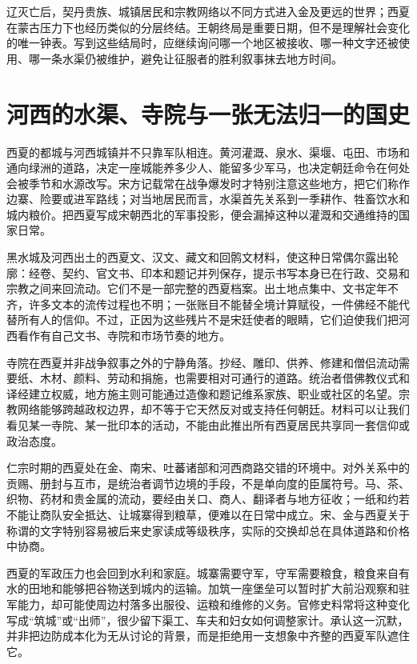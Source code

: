 辽灭亡后，契丹贵族、城镇居民和宗教网络以不同方式进入金及更远的世界；西夏在蒙古压力下也经历类似的分层终结。王朝终局是重要日期，但不是理解社会变化的唯一钟表。写到这些结局时，应继续询问哪一个地区被接收、哪一种文字还被使用、哪一条水渠仍被维护，避免让征服者的胜利叙事抹去地方时间。


\section{河西的水渠、寺院与一张无法归一的国史}

西夏的都城与河西城镇并不只靠军队相连。黄河灌溉、泉水、渠堰、屯田、市场和通向绿洲的道路，决定一座城能养多少人、能留多少军马，也决定朝廷命令在何处会被季节和水源改写。宋方记载常在战争爆发时才特别注意这些地方，把它们称作边寨、险要或进军路线；对当地居民而言，水渠首先关系到一季耕作、牲畜饮水和城内粮价。把西夏写成宋朝西北的军事投影，便会漏掉这种以灌溉和交通维持的国家日常。

黑水城及河西出土的西夏文、汉文、藏文和回鹘文材料，使这种日常偶尔露出轮廓：经卷、契约、官文书、印本和题记并列保存，提示书写本身已在行政、交易和宗教之间来回流动。它们不是一部完整的西夏档案。出土地点集中、文书定年不齐，许多文本的流传过程也不明；一张账目不能替全境计算赋役，一件佛经不能代替所有人的信仰。不过，正因为这些残片不是宋廷使者的眼睛，它们迫使我们把河西看作有自己文书、寺院和市场节奏的地方。

寺院在西夏并非战争叙事之外的宁静角落。抄经、雕印、供养、修建和僧侣流动需要纸、木材、颜料、劳动和捐施，也需要相对可通行的道路。统治者借佛教仪式和译经建立权威，地方施主则可能通过造像和题记维系家族、职业或社区的名望。宗教网络能够跨越政权边界，却不等于它天然反对或支持任何朝廷。材料可以让我们看见某一寺院、某一批印本的活动，不能由此推出所有西夏居民共享同一套信仰或政治态度。

仁宗时期的西夏处在金、南宋、吐蕃诸部和河西商路交错的环境中。对外关系中的贡赐、册封与互市，是统治者调节边境的手段，不是单向度的臣属符号。马、茶、织物、药材和贵金属的流动，要经由关口、商人、翻译者与地方征收；一纸和约若不能让商队安全抵达、让城寨得到粮草，便难以在日常中成立。宋、金与西夏关于称谓的文字特别容易被后来史家读成等级秩序，实际的交换却总在具体道路和价格中协商。

西夏的军政压力也会回到水利和家庭。城寨需要守军，守军需要粮食，粮食来自有水的田地和能够把谷物送到城内的运输。加筑一座堡垒可以暂时扩大前沿观察和驻军能力，却可能使周边村落多出服役、运粮和维修的义务。官修史料常将这种变化写成“筑城”或“出师”，很少留下渠工、车夫和妇女如何调整家计。承认这一沉默，并非把边防成本化为无从讨论的背景，而是拒绝用一支想象中齐整的西夏军队遮住它。

